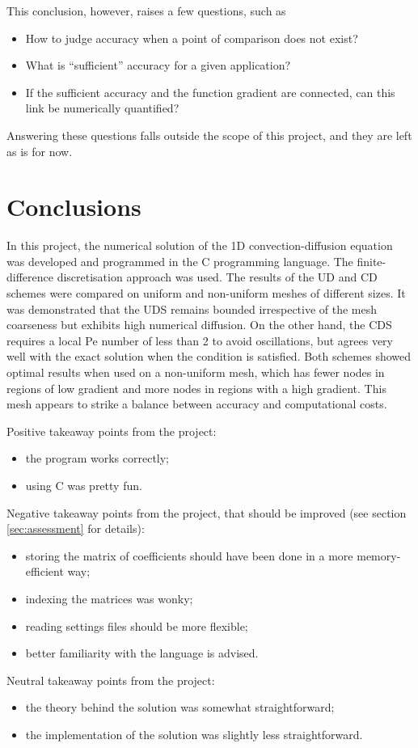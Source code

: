\documentclass[12pt]{article}
\begin{document}
This conclusion, however, raises a few questions, such as

\begin{itemize}
    \item How to judge accuracy when a point of comparison does not exist?
    \item What is ``sufficient'' accuracy for a given application?
    \item If the sufficient accuracy and the function gradient are connected, can this link be numerically quantified?
\end{itemize}

Answering these questions falls outside the scope of this project, and they are left as is for now.


\section{Conclusions}
\label{sec:conclusions}

In this project, the numerical solution of the 1D convection-diffusion equation was developed and programmed in the C programming language. The finite-difference discretisation approach was used. The results of the UD and CD schemes were compared on uniform and non-uniform meshes of different sizes. It was demonstrated that the UDS remains bounded irrespective of the mesh coarseness but exhibits high numerical diffusion. On the other hand, the CDS requires a local Pe number of less than 2 to avoid oscillations, but agrees very well with the exact solution when the condition is satisfied. Both schemes showed optimal results when used on a non-uniform mesh, which has fewer nodes in regions of low gradient and more nodes in regions with a high gradient. This mesh appears to strike a balance between accuracy and computational costs.

Positive takeaway points from the project:

\begin{itemize}
    \item the program works correctly;
    \item using C was pretty fun.
\end{itemize}

Negative takeaway points from the project, that should be improved (see section \ref{sec:assessment} for details):

\begin{itemize}
    \item storing the matrix of coefficients should have been done in a more memory-efficient way;
    \item indexing the matrices was wonky;
    \item reading settings files should be more flexible;
    \item better familiarity with the language is advised.
\end{itemize}

Neutral takeaway points from the project:

\begin{itemize}
    \item the theory behind the solution was somewhat straightforward;
    \item the implementation of the solution was slightly less straightforward.
\end{itemize}


\printbibliography[heading=bibintoc, title={Bibliography}]
\end{document}
